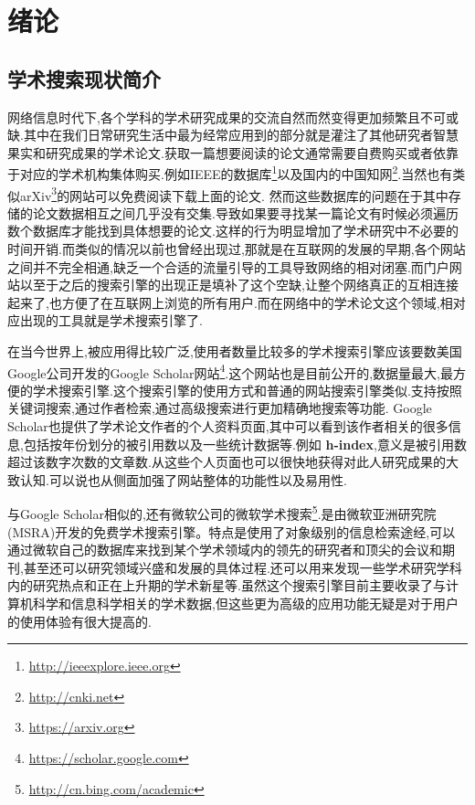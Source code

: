 
\chapter{绪论}
\label{chap:introduction}

\section{学术搜索现状简介}
\label{sec:academic-intro}

网络信息时代下,各个学科的学术研究成果的交流自然而然变得更加频繁且不可或缺.其中在我们日常研究生活中最为经常应用到的部分就是灌注了其他研究者智慧果实和研究成果的学术论文.获取一篇想要阅读的论文通常需要自费购买或者依靠于对应的学术机构集体购买.例如IEEE的数据库\footnote{\url{http://ieeexplore.ieee.org}}以及国内的中国知网\footnote{\url{http://cnki.net}}.当然也有类似arXiv\footnote{\url{https://arxiv.org}}的网站可以免费阅读下载上面的论文. 然而这些数据库的问题在于其中存储的论文数据相互之间几乎没有交集.导致如果要寻找某一篇论文有时候必须遍历数个数据库才能找到具体想要的论文.这样的行为明显增加了学术研究中不必要的时间开销.而类似的情况以前也曾经出现过,那就是在互联网的发展的早期,各个网站之间并不完全相通,缺乏一个合适的流量引导的工具导致网络的相对闭塞.而门户网站以至于之后的搜索引擎的出现正是填补了这个空缺,让整个网络真正的互相连接起来了,也方便了在互联网上浏览的所有用户.而在网络中的学术论文这个领域,相对应出现的工具就是学术搜索引擎了.

在当今世界上,被应用得比较广泛,使用者数量比较多的学术搜索引擎应该要数美国Google公司开发的Google Scholar网站\footnote{\url{https://scholar.google.com}}.这个网站也是目前公开的,数据量最大,最方便的学术搜索引擎.这个搜索引擎的使用方式和普通的网站搜索引擎类似.支持按照关键词搜索,通过作者检索,通过高级搜索进行更加精确地搜索等功能\cite{夏旭2006基于}. Google Scholar也提供了学术论文作者的个人资料页面,其中可以看到该作者相关的很多信息,包括按年份划分的被引用数以及一些统计数据等.例如 \textbf{h-index},意义是被引用数超过该数字次数的文章数.从这些个人页面也可以很快地获得对此人研究成果的大致认知.可以说也从侧面加强了网站整体的功能性以及易用性.

与Google Scholar相似的,还有微软公司的微软学术搜索\footnote{\url{http://cn.bing.com/academic}}.是由微软亚洲研究院(MSRA)开发的免费学术搜索引擎。特点是使用了对象级别的信息检索途经,可以通过微软自己的数据库来找到某个学术领域内的领先的研究者和顶尖的会议和期刊,甚至还可以研究领域兴盛和发展的具体过程.还可以用来发现一些学术研究学科内的研究热点和正在上升期的学术新星等.虽然这个搜索引擎目前主要收录了与计算机科学和信息科学相关的学术数据,但这些更为高级的应用功能无疑是对于用户的使用体验有很大提高的.

